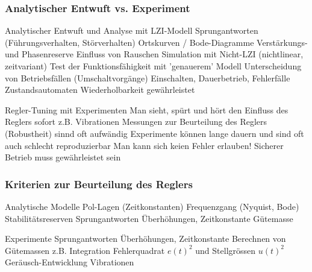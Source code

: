\subsubsection{Analytischer Entwuft vs. Experiment}

\begin{minipage}[t]{0.48\columnwidth}
    \begin{outline}
        \1 Analytischer Entwuft und Analyse mit LZI-Modell
            \2 Sprungantworten (Führungsverhalten, Störverhalten)
            \2 Ortskurven / Bode-Diagramme
            \2 Verstärkungs- und Phasenreserve
            \2 Einfluss von Rauschen
        \1 Simulation mit Nicht-LZI (nichtlinear, zeitvariant)
            \2 Test der Funktionsfähigkeit mit 'genauerem' Modell
            \2 Unterscheidung von Betriebsfällen (Umschaltvorgänge)
                \3 Einschalten, Dauerbetrieb, Fehlerfälle
                \3 Zustandsautomaten
            \2 Wiederholbarkeit gewährleistet
    \end{outline}
\end{minipage}
\hfill
\begin{minipage}[t]{0.48\columnwidth}
    \begin{outline}
        \1 Regler-Tuning mit Experimenten
            \2 Man sieht, spürt und hört den Einfluss des Reglers sofort
                \3 z.B. Vibrationen
            \2 Messungen zur Beurteilung des Reglers (Robustheit) sinnd oft aufwändig
            \2 Experimente können lange dauern und sind oft auch schlecht reproduzierbar
            \2 Man kann sich keien Fehler erlauben!
                \3 Sicherer Betrieb muss gewährleistet sein
    \end{outline}
\end{minipage}


\subsubsection{Kriterien zur Beurteilung des Reglers}

\begin{minipage}[t]{0.48\columnwidth}
    \begin{outline}
        \1 Analytische Modelle
            \2 Pol-Lagen (Zeitkonstanten)
            \2 Frequenzgang (Nyquist, Bode)
            \2 Stabilitätsreserven
            \2 Sprungantworten 
                \3 Überhöhungen, Zeitkonstante
            \2 Gütemasse
    \end{outline}
\end{minipage}
\hfill
\begin{minipage}[t]{0.48\columnwidth}
    \begin{outline}
        \1 Experimente
            \2 Sprungantworten
                \3 Überhöhungen, Zeitkonstante
            \2 Berechnen von Gütemassen 
                \3 z.B. Integration Fehlerquadrat $e(t)^2$ und Stellgrössen $u(t)^2$
            \2 Geräusch-Entwicklung
            \2 Vibrationen
    \end{outline}
\end{minipage}


